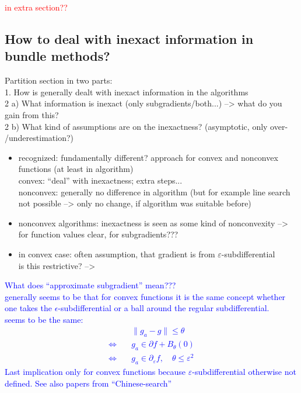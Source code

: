 \textcolor{red}{in extra section??} \\

\subsection{How to deal with inexact information in bundle methods?}

Partition section in two parts: \\
1. How is generally dealt with inexact information in the algorithms \\
2 a) What information is inexact (only subgradients/both...) --> what do you gain from this? \\
2 b) What kind of assumptions are on the inexactness? (asymptotic, only over- /underestimation?)

\begin{itemize}
	\item recognized: fundamentally different? approach for convex and nonconvex functions (at least in algorithm) \\
	convex: ``deal'' with inexactness; extra steps... \\
	nonconvex: generally no difference in algorithm (but for example line search not possible --> only no change, if algorithm was suitable before)
	\item nonconvex algorithms: inexactness is seen as some kind of nonconvexity --> for function values clear, for subgradients???
	\item in convex case: often assumption, that gradient is from \(\varepsilon\)-subdifferential \\
	is this restrictive? --> 
\end{itemize}

\textcolor{blue}{What does ``approximate subgradient'' mean??? \\
generally seems to be that for convex functions it is the same concept whether one takes the \(\epsilon\)-subdifferential or a ball around the regular subdifferential.} \\
\textcolor{blue}{seems to be the same:
\begin{align}
	& \|g_a-g\| \leq \theta \\
	\Leftrightarrow \quad & g_a \in \partial f + B_\theta(0) \\
	\Leftrightarrow \quad & g_a \in \partial_{\varepsilon}f, \quad \theta \leq \varepsilon^2
\end{align}
Last implication only for convex functions because \(\varepsilon\)-subdifferential otherwise not defined.
See also papers from ``Chinese-search''} \\

